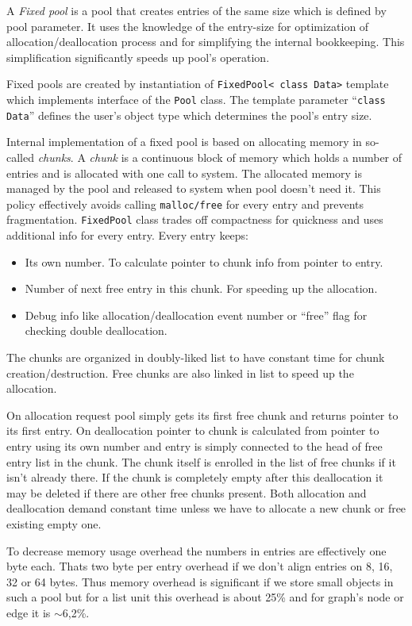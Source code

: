 \documentclass[11pt,twoside,a4paper]{article}
\begin{document}
A \emph{Fixed pool} is a pool that creates entries of the same size which is defined by pool parameter. It uses the knowledge of the entry-size for optimization of allocation/deallocation process and for simplifying the internal bookkeeping. This simplification significantly speeds up pool's operation.

Fixed pools are created by instantiation of \lstinline{FixedPool< class Data>} template which implements interface of the \lstinline{Pool} class. The template parameter ``\lstinline{class Data}'' defines the user's object type which determines the pool's entry size.

Internal implementation of a fixed pool is based on allocating memory in so-called \emph{chunks}. A \emph{chunk} is a continuous block of memory which holds a number of entries and is allocated with one call to system. The allocated memory is managed by the pool and released to system when pool doesn't need it. This policy effectively avoids calling \lstinline{malloc/free} for every entry and prevents fragmentation. \lstinline{FixedPool} class trades off compactness for quickness and uses additional info for every entry. Every entry keeps:
\begin{itemize}
\item Its own number. To calculate pointer to chunk info from pointer to entry.
\item Number of next free entry in this chunk. For speeding up the allocation.
\item Debug info like allocation/deallocation event number or ``free'' flag for checking double deallocation.
\end{itemize}
The chunks are organized in doubly-liked list to have constant time for chunk creation/destruction. Free chunks are also linked in list to speed up the allocation. 

On allocation request pool simply gets its first free chunk and returns pointer to its first entry. On deallocation pointer to chunk is calculated from pointer to entry using its own number and entry is simply connected to the head of free entry list in the chunk. The chunk itself is enrolled in the list of free chunks if it isn't already there. If the chunk is completely empty after this deallocation it may be deleted if there are other free chunks present. Both allocation and deallocation demand constant time unless we have to allocate a new chunk or free existing empty one.

To decrease memory usage overhead the numbers in entries are effectively one byte each. Thats two byte per entry overhead if we don't align entries on 8, 16, 32 or 64 bytes. Thus memory overhead is significant if we store small objects in such a pool but for a list unit this overhead is about 25\% and for graph's node or edge it is $\sim$6,2\%.
\end{document}
